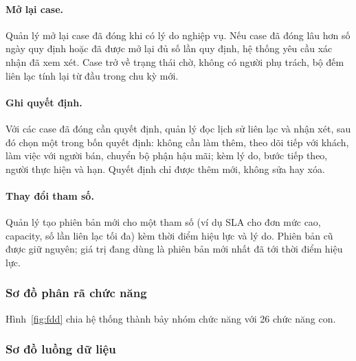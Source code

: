 
\paragraph{Mở lại case.} Quản lý mở lại case đã đóng khi có lý do nghiệp vụ. Nếu case đã đóng lâu
hơn số ngày quy định hoặc đã được mở lại đủ số lần quy định, hệ thống yêu cầu xác nhận đã xem xét.
Case trở về trạng thái chờ, không có người phụ trách, bộ đếm liên lạc tính lại từ đầu trong chu kỳ
mới.


\paragraph{Ghi quyết định.} Với các case đã đóng cần quyết định, quản lý đọc lịch sử liên lạc và
nhận xét, sau đó chọn một trong bốn quyết định: không cần làm thêm, theo dõi tiếp với khách, làm
việc với người bán, chuyển bộ phận hậu mãi; kèm lý do, bước tiếp theo, người thực hiện và hạn. Quyết
định chỉ được thêm mới, không sửa hay xóa.


\paragraph{Thay đổi tham số.} Quản lý tạo phiên bản mới cho một tham số (ví dụ SLA cho đơn mức cao,
capacity, số lần liên lạc tối đa) kèm thời điểm hiệu lực và lý do. Phiên bản cũ được giữ nguyên;
giá trị đang dùng là phiên bản mới nhất đã tới thời điểm hiệu lực.


\subsubsection{Sơ đồ phân rã chức năng}

Hình~\ref{fig:fdd} chia hệ thống thành bảy nhóm chức năng với 26 chức năng con.


\subsubsection{Sơ đồ luồng dữ liệu}

